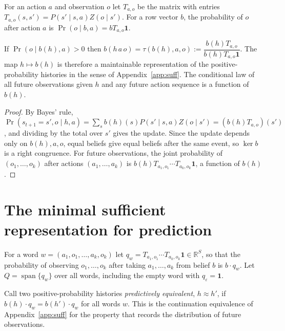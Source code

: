 For an action $a$ and observation $o$ let $T_{a,o}$ be the matrix with entries $T_{a,o}(s,s')=P(s'\mid s,a)Z(o\mid s')$. For a row vector $b$, the probability of $o$ after action $a$ is $\Pr(o\mid b,a)=bT_{a,o}\mathbf 1$.

\begin{established}\label{thm:belief}
If $\Pr(o\mid b(h),a)>0$ then $b(h\,a\,o)=\tau(b(h),a,o):=\dfrac{b(h)T_{a,o}}{b(h)T_{a,o}\mathbf 1}$. The map $h\mapsto b(h)$ is therefore a maintainable representation of the positive-probability histories in the sense of Appendix~\ref{app:suff}. The conditional law of all future observations given $h$ and any future action sequence is a function of $b(h)$.
\end{established}
\begin{proof}
By Bayes' rule, $\Pr(s_{t+1}=s',o\mid h,a)=\sum_sb(h)(s)P(s'\mid s,a)Z(o\mid s')=(b(h)T_{a,o})(s')$, and dividing by the total over $s'$ gives the update. Since the update depends only on $b(h),a,o$, equal beliefs give equal beliefs after the same event, so $\ker b$ is a right congruence. For future observations, the joint probability of $(o_1,\dots,o_k)$ after actions $(a_1,\dots,a_k)$ is $b(h)T_{a_1,o_1}\cdots T_{a_k,o_k}\mathbf 1$, a function of $b(h)$.
\end{proof}

\section{The minimal sufficient representation for prediction}

For a word $w=(a_1,o_1,\dots,a_k,o_k)$ let $q_w=T_{a_1,o_1}\cdots T_{a_k,o_k}\mathbf 1\in\mathbb R^{S}$, so that the probability of observing $o_1,\dots,o_k$ after taking $a_1,\dots,a_k$ from belief $b$ is $b\cdot q_w$. Let $Q=\operatorname{span}\{q_w\}$ over all words, including the empty word with $q_\varepsilon=\mathbf 1$.

Call two positive-probability histories \emph{predictively equivalent}, $h\approx h'$, if $b(h)\cdot q_w=b(h')\cdot q_w$ for all words $w$. This is the continuation equivalence of Appendix~\ref{app:suff} for the property that records the distribution of future observations.

